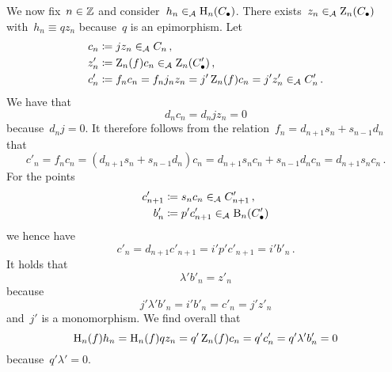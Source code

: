 We now fix~$n \in \mathbb{Z}$ and consider~$h_n \in_{\mathcal{A}} \operatorname{H}_n(C_\bullet)$.
There exists~$z_n \in_{\mathcal{A}} \operatorname{Z}_n(C_\bullet)$ with~$h_n \equiv q z_n$ because~$q$ is an epimorphism.
Let
\begin{align*}
            c_n
  &\coloneqq j z_n
  \in_{\mathcal{A}}      C_n \,,
  \\
            z'_n
  &\coloneqq \operatorname{Z}_n(f) c_n
  \in_{\mathcal{A}}      \operatorname{Z}_n(C_\bullet')  \,,
  \\
            c'_n
  &\coloneqq f_n c_n = f_n j_n z_n = j' \operatorname{Z}_n(f) c_n = j' z'_n
  \in_{\mathcal{A}}      C'_n \,.
\end{align*}
We have that
\[
    d_n c_n
  = d_n j z_n
  = 0
\]
because~$d_n j = 0$.
It therefore follows from the relation~$f_n = d_{n+1} s_n + s_{n-1} d_n$ that
\[
    c'_n
  = f_n c_n
  = (d_{n+1} s_n + s_{n-1} d_n) c_n
  = d_{n+1} s_n c_n + s_{n-1} d_n c_n
  = d_{n+1} s_n c_n \,.
\]
For the points
\begin{align*}
  c'_{n+1}  &\coloneqq s_n c_n \in_{\mathcal{A}} C'_{n+1} \,, \\
  b'_n      &\coloneqq p' c'_{n+1} \in_{\mathcal{A}} \operatorname{B}_n(C_\bullet')
\end{align*}
we hence have
\[
    c'_n
  = d_{n+1} c'_{n+1}
  = i' p' c'_{n+1}
  = i' b'_n \,.
\]
It holds that
\[
    \lambda' b'_n
  = z'_n
\]
because
\[
    j' \lambda' b'_n
  = i' b'_n
  = c'_n
  = j' z'_n
\]
and~$j'$ is a monomorphism.
We find overall that
\[
    \operatorname{H}_n(f) h_n
  = \operatorname{H}_n(f) q z_n
  = q' \operatorname{Z}_n(f) c_n
  = q' c'_n
  = q' \lambda' b'_n
  = 0
\]
because~$q' \lambda' = 0$.
